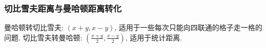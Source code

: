 \subsubsection{切比雪夫距离与曼哈顿距离转化}
曼哈顿转切比雪夫: $(x+y,x-y)$, 适用于一些每次只能向四联通的格子走一格的问题. 切比雪夫转曼哈顿: $(\frac{x+y}{2}, \frac{x-y}{2})$, 适用于统计距离.